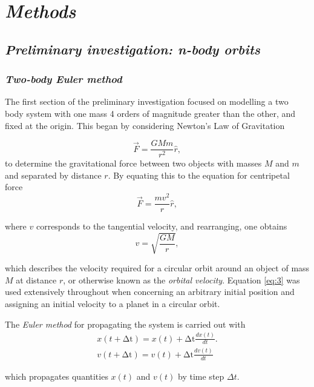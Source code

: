 \documentclass[11pt, english]{report}
\begin{document}
\chapter{\textsl{Methods}}

\section{\textsl{Preliminary investigation: n-body orbits}}
\subsection{\textsl{Two-body Euler method}}

\normalsize{\noindent 
The first section of the preliminary investigation focused on modelling a two body system with one mass 4 orders of magnitude greater than the other, and fixed at the origin. This began by considering Newton's Law of Gravitation \cite{newton_principia_1999}

\begin{equation} \label{eq:1}
    \vec{F} = \frac{GMm}{r^2} \hat{r},
\end{equation}
to determine the gravitational force between two objects with masses $M$ and $m$ and separated by distance $r$. By equating this to the equation for centripetal force \cite{newton_principia_1999} \begin{equation}
    \vec{F} = \frac{mv^2}{r} \hat{r},
\end{equation}

\noindent where $v$ corresponds to the tangential velocity, and rearranging, one obtains 
\begin{equation} \label{eq:3}
    v = \sqrt{\frac{GM}{r}},
\end{equation}

\noindent which describes the velocity required for a circular orbit around an object of mass $M$ at distance $r$, or otherwise known as the \emph{orbital velocity}. Equation \ref{eq:3} was used extensively throughout when concerning an arbitrary initial position and assigning an initial velocity to a planet in a circular orbit. 

The \emph{Euler method} \cite{bowler_phas0030_nodate} for propagating the system is carried out with 
\begin{align}
    x\left(t+\mathrm{\Delta t}\right)=x\left(t\right)+\mathrm{\Delta t}\frac{dx\left(t\right)}{dt}.\\
    v\left(t+\mathrm{\Delta t}\right)=v\left(t\right)+\mathrm{\Delta t}\frac{dv\left(t\right)}{dt}
\end{align}

\noindent which propagates quantities $x(t)$ and $v(t)$ by time step $\Delta t$.
}
\end{document}
